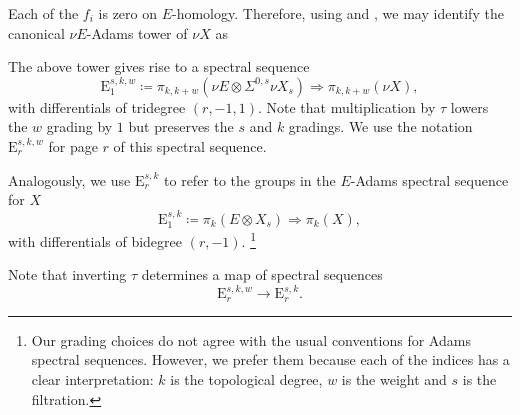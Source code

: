 \begin{center}
\end{center}
Each of the $f_i$ is zero on $E$-homology. Therefore, using  and , we may identify the canonical $\nu E$-Adams tower of $\nu X$ as
\begin{center}
\end{center}


\begin{ntn}
The above tower gives rise to a spectral sequence
 $$ \mathrm{E}^{s,k,w}_1 \coloneqq \pi_{k, k+w} \left( \nu E \otimes \Sigma^{0,s} \nu X_s \right) \Longrightarrow \pi_{k, k+w}(\nu X), $$
 with differentials of tridegree $(r, -1, 1)$. Note that multiplication by $\tau$ lowers the $w$ grading by $1$ but preserves the $s$ and $k$ gradings.
  We use the notation $\mathrm{E}^{s,k,w}_r$ for page $r$ of this spectral sequence.

  Analogously, we use $\mathrm{E}^{s,k}_r$ to refer to the groups in the $E$-Adams spectral sequence for $X$
 $$ \mathrm{E}^{s,k}_1 \coloneqq \pi_k \left( E \otimes X_s \right) \Longrightarrow \pi_k(X), $$
with differentials of bidegree $(r, -1)$. \footnote{Our grading choices do not agree with the usual conventions for Adams spectral sequences. However, we prefer them because each of the indices has a clear interpretation: $k$ is the topological degree, $w$ is the weight and $s$ is the filtration.}
\end{ntn}
 Note that inverting $\tau$ determines a map of spectral sequences
 $$ \mathrm{E}_r^{s,k,w} \to \mathrm{E}_r^{s,k}. $$

